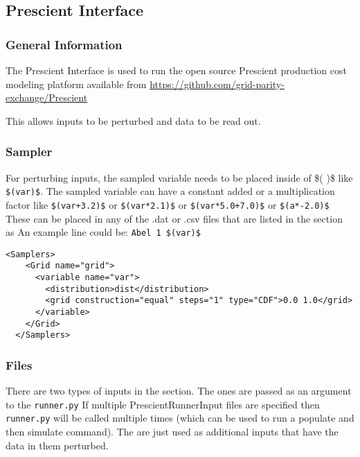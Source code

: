 \subsection{Prescient Interface}
\label{subsec:prescientInterface}

\subsubsection{General Information}
The Prescient Interface is used to run the open source Prescient
production cost modeling platform available from
\url{https://github.com/grid-parity-exchange/Prescient}

This allows inputs to be perturbed and data to be read out.

\subsubsection{Sampler}

For perturbing inputs, the sampled variable needs to be placed inside
of \$( )\$ like \verb'$(var)$'. The sampled variable can have a
constant added or a multiplication factor like \verb'$(var+3.2)$' or
\verb'$(var*2.1)$' or \verb'$(var*5.0+7.0)$' or \verb'$(a*-2.0)$'
These can be placed in any of the .dat or .csv files that are listed
in the  section as  An
example line could be: \verb'Abel 1 $(var)$'

\begin{lstlisting}[style=XML]
  <Samplers>
    <Grid name="grid">
      <variable name="var">
        <distribution>dist</distribution>
        <grid construction="equal" steps="1" type="CDF">0.0 1.0</grid>
      </variable>
    </Grid>
  </Samplers>
\end{lstlisting}


\subsubsection{Files}

There are two types of inputs in the  section.  The
 ones are passed as an argument
to the \texttt{runner.py} If multiple PrescientRunnerInput files are
specified then \texttt{runner.py} will be called multiple times (which
can be used to run a populate and then simulate command).  The
 are just used as additional inputs
that have the data in them perturbed.


